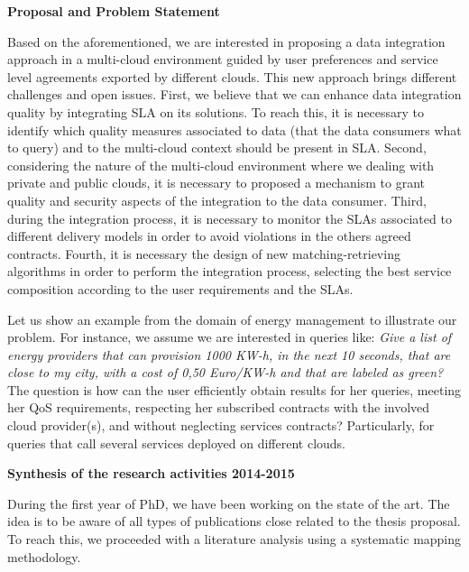 \documentclass[12pt,a4paper,oneside]{report}
\begin{document}
\begin{flushleft}
\textbf{Proposal and Problem Statement}\\
\end{flushleft}

Based on the aforementioned, we are interested in proposing a data integration approach in a multi-cloud environment guided by user preferences and service level agreements exported by different clouds.
This new approach brings different challenges and open issues.
First, we believe that we can enhance data integration quality by integrating SLA on its solutions. To reach this, it is necessary to identify which quality measures associated to data (that the data consumers what to query) and to the multi-cloud context should be present in SLA.
Second, considering the nature of the multi-cloud environment where we dealing with private and public clouds, it is necessary to proposed a mechanism to grant quality and security aspects of the integration to the data consumer.
Third, during the integration process, it is necessary to monitor the SLAs associated to different delivery models in order to avoid violations in the others agreed contracts.
Fourth, it is necessary the design of new matching-retrieving algorithms in order to perform the integration process, selecting the best service composition according to the user requirements and the SLAs.

Let us show an example from the domain of energy management to illustrate our problem. 
For instance, we assume we are interested in queries like: \textit{Give a list of energy providers that can provision 1000 KW-h, in the next 10 seconds, that are close to my city, with a cost of 0,50 Euro/KW-h and that are labeled as green?} The question is how can the user efficiently obtain results for her queries, meeting her QoS requirements, respecting her subscribed contracts with the involved cloud provider(s), and without neglecting services contracts? 
Particularly, for queries that call several services deployed on different clouds.

\begin{flushleft}
\textbf{Synthesis of the research activities 2014-2015}\\
\end{flushleft}
During the first year of PhD, we have been working on the state of the art. 
The idea is to be aware of all types of publications close related to the thesis proposal. To reach this, we proceeded with a literature analysis using a systematic mapping methodology. 
\end{document}
